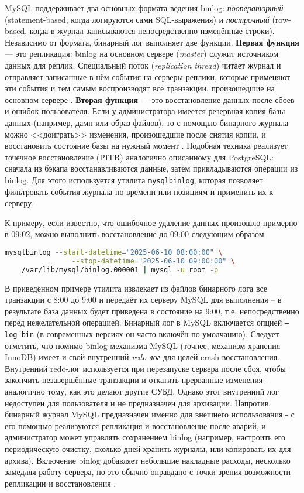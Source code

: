  MySQL поддерживает два основных формата ведения binlog: \textit{пооператорный} (statement-based, когда логируются сами SQL-выражения) и \textit{построчный} (row-based, когда в журнал записываются непосредственно изменённые строки). Независимо от формата, бинарный лог выполняет две функции. \textbf{Первая функция} — это репликация: binlog на основном сервере (\textit{master}) служит источником данных для реплик. Специальный поток (\textit{replication thread}) читает журнал и отправляет записанные в нём события на серверы-реплики, которые применяют эти события и тем самым воспроизводят все транзакции, произошедшие на основном сервере \autocite{Mysqldoc7}. \textbf{Вторая функция} — это восстановление данных после сбоев и ошибок пользователя. Если у администратора имеется резервная копия базы данных (например, дамп или образ файлов), то с помощью бинарного журнала можно <<доиграть>> изменения, произошедшие после снятия копии, и восстановить состояние базы на нужный момент \autocite{Mysqldoc7}. Подобная техника реализует точечное восстановление (PITR) аналогично описанному для PostgreSQL: сначала из бэкапа восстанавливаются данные, затем прикладываются операции из binlog. Для этого используется утилита \texttt{mysqlbinlog}, которая позволяет фильтровать события журнала по времени или позициям и применить их к серверу. 
 
 К примеру, если известно, что ошибочное удаление данных произошло примерно в 09:02, можно выполнить восстановление до 09:00 следующим образом:

 \begin{lstlisting}[language=bash]
    mysqlbinlog --start-datetime="2025-06-10 08:00:00" \
                --stop-datetime="2025-06-10 09:00:00" \
    /var/lib/mysql/binlog.000001 | mysql -u root -p
 \end{lstlisting}
 
 В приведённом примере утилита извлекает из файлов бинарного лога все транзакции с 8:00 до 9:00 и передаёт их серверу MySQL для выполнения – в результате база данных будет приведена в состояние на 9:00, т.е. непосредственно перед нежелательной операцией. Бинарный лог в MySQL включается опцией \texttt{--log-bin} (в современных версиях он часто включён по умолчанию). Следует отметить, что помимо binlog механизма MySQL (точнее, механизм хранения InnoDB) имеет и свой внутренний \textit{redo-лог} для целей crash-восстановления. Внутренний redo-лог используется при перезапуске сервера после сбоя, чтобы закончить незавершённые транзакции и откатить прерванные изменения – аналогично тому, как это делают другие СУБД. Однако этот внутренний лог недоступен для пользователя и не предназначен для архивации. Напротив, бинарный журнал MySQL предназначен именно для внешнего использования - с его помощью реализуются репликация и восстановление после аварий, и администратор может управлять сохранением binlog (например, настроить его периодическую очистку, сколько дней хранить журналы, или копировать их для архива). Включение binlog добавляет небольшие накладные расходы, несколько замедляя работу сервера, но это обычно оправдано с точки зрения возможности репликации и восстановления \autocite{Mysqldoc7}. 
 
